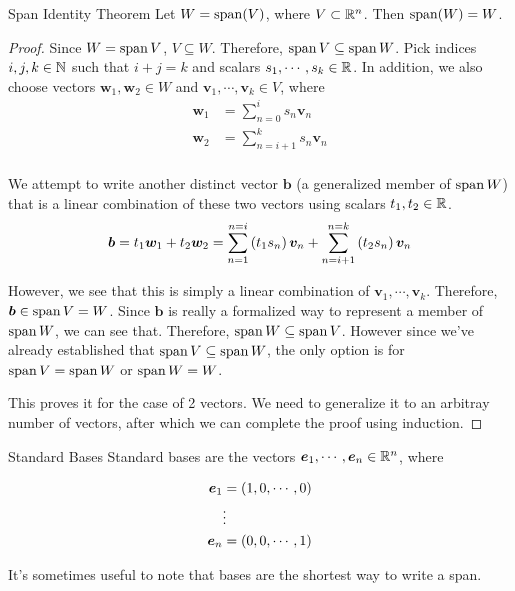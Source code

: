 \documentclass[11pt]{article}
\begin{document}
\begin{theorem}{Span Identity Theorem}
  Let $W = \operatorname{span}(V)$, where $V \subset \mathbb{R}^n$.
  Then $\operatorname{span}(W) = W$.
  \begin{proof}
    Since $W = \operatorname{span} V$, $V \subseteq W$.
    Therefore, $\operatorname{span} V \subseteq \operatorname{span} W$.
    Pick indices $i, j, k \in \mathbb N $ such that $i + j = k$ and scalars $s_1, \cdots, s_k \in \mathbb R$.
    In addition, we also choose vectors $\bm{w}_1, \bm{w}_2 \in W$ and $\bm{v}_1, \cdots, \bm{v}_k \in V$, where
    \begin{align*}
      \bm{w}_1 &= \sum \limits_{n=0}^i s_n \bm{v}_n\\
      \bm{w}_2 &= \sum \limits_{n=i+1}^{k} s_n \bm{v}_n\\
    \end{align*}
    
    We attempt to write another distinct vector $\bm{b}$ (a generalized member of $\operatorname{span} W$) that is a linear combination of these two vectors using scalars $t_1, t_2 \in \mathbb R$.
    $$
    \bm{b} = t_1 \bm{w}_1 + t_2 \bm{w}_2 = \sum \limits_{n=1}^{n=i} \left ( t_1 s_n \right) \bm{v}_n  + \sum \limits_{n=i+1}^{n=k} \left ( t_2 s_n \right) \bm{v}_n
    $$

    However, we see that this is simply a linear combination of $\bm{v}_1, \cdots, \bm{v}_k$.
    Therefore, $\bm{b} \in \operatorname{span} V = W$.
    Since $\bm{b}$ is really a formalized way to represent a member of $\operatorname{span} W$, we can see that. Therefore, $\operatorname{span} W \subseteq \operatorname{span} V$.
    However since we've already established that $\operatorname{span} V \subseteq \operatorname{span} W$, the only option is for $\operatorname{span} V = \operatorname{span} W$ or $\operatorname{span} W = W$.

    This proves it for the case of 2 vectors.
    We need to generalize it to an arbitray number of vectors, after which we can complete the proof using induction.
  \end{proof}
\end{theorem}





\begin{definition}{Standard Bases}
  Standard bases are the vectors $\bm{e}_1, \cdots, \bm{e}_n \in \mathbb{R}^n$, where

  \begin{align*}
    \bm{e}_1 &= \left ( 1, 0, \cdots, 0 \right) \\
    & \vdots \\
    \bm{e}_n &= \left ( 0, 0, \cdots, 1 \right) \\
  \end{align*}

  It's sometimes useful to note that bases are the shortest way to write a span.
\end{definition}
\end{document}
